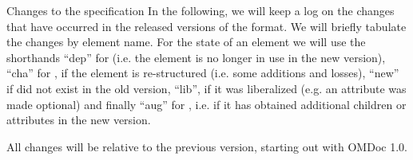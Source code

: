 \begin{tchapter}[id=changelog]{Changes to the specification}
In the following, we will keep a log on the changes that have occurred in the
released versions of the {\omdoc} format.  We will briefly tabulate the changes by
element name. For the state of an element we will use the shorthands ``dep'' for
{} (i.e. the element is no longer in use in the new {\omdoc}
version), ``cha'' for {}, if the element is re-structured (i.e.
some additions and losses), ``new'' if did not exist in the old {\omdoc} version,
``lib'', if it was liberalized (e.g. an attribute was made optional) and finally
``aug'' for {}, i.e. if it has obtained additional children or
attributes in the new {\omdoc} version.

All changes will be relative to the previous version, starting out with OMDoc 1.0.



\end{tchapter}


